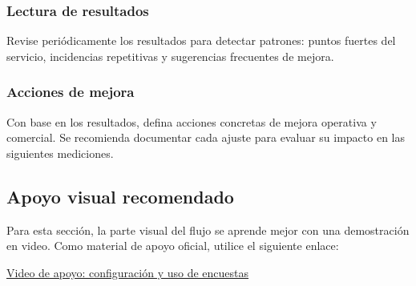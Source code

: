 \subsubsection{Lectura de resultados}
\noindent Revise periódicamente los resultados para detectar patrones: puntos fuertes del servicio, incidencias repetitivas y sugerencias frecuentes de mejora.
\subsubsection{Acciones de mejora}
\noindent Con base en los resultados, defina acciones concretas de mejora operativa y comercial. Se recomienda documentar cada ajuste para evaluar su impacto en las siguientes mediciones.

\subsection{Apoyo visual recomendado}
\noindent Para esta sección, la parte visual del flujo se aprende mejor con una demostración en video. Como material de apoyo oficial, utilice el siguiente enlace:

\noindent \href{https://youtu.be/Iv9yd-VFe90?si=qw1tjA2YIO08mhW3}{Video de apoyo: configuración y uso de encuestas}
